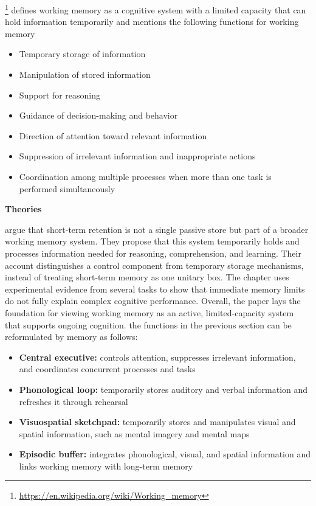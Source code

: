 \documentclass{book}
\providecommand{\ProjectDeepHeading}[2]{%
    \par\medskip\noindent\textbf{#2}\par\smallskip
}
\providecommand{\clickurlfooter}[1]{\footnote{\url{#1}}}
\begin{document}

\clickurlfooter{https://en.wikipedia.org/wiki/Working_memory} defines working memory as a cognitive system with a limited capacity that can hold information temporarily
    and mentions the following functions for working memory
    \begin{itemize}
        \item Temporary storage of information
        \item Manipulation of stored information
        \item Support for reasoning
        \item Guidance of decision-making and behavior
        \item Direction of attention toward relevant information
        \item Suppression of irrelevant information and inappropriate actions
        \item Coordination among multiple processes when more than one task is performed simultaneously
    \end{itemize}
    
    
    \ProjectDeepHeading{8}{Theories}
        \cite{baddeley-1974-working-memory} argue that short-term retention is not a single passive store but part of a broader working memory system. They propose that this system temporarily holds and processes information needed for reasoning, comprehension, and learning. Their account distinguishes a control component from temporary storage mechanisms, instead of treating short-term memory as one unitary box. The chapter uses experimental evidence from several tasks to show that immediate memory limits do not fully explain complex cognitive performance. Overall, the paper lays the foundation for viewing working memory as an active, limited-capacity system that supports ongoing cognition.
        the functions in the previous section can be reformulated by \cite{baddeley-1974-working-memory} memory as follows:
        \begin{itemize}
            \item \textbf{Central executive:} controls attention, suppresses irrelevant information, and coordinates concurrent processes and tasks
            \item \textbf{Phonological loop:} temporarily stores auditory and verbal information and refreshes it through rehearsal
            \item \textbf{Visuospatial sketchpad:} temporarily stores and manipulates visual and spatial information, such as mental imagery and mental maps
            \item \textbf{Episodic buffer:} integrates phonological, visual, and spatial information and links working memory with long-term memory
        \end{itemize}
        
\end{document}
